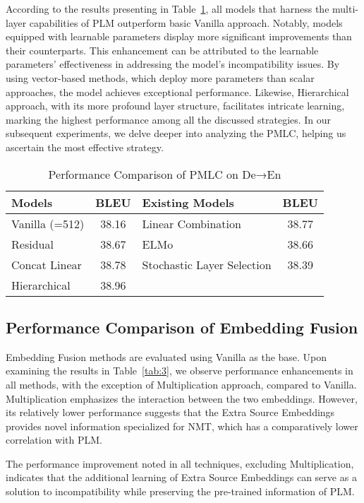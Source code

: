 \documentclass[conference]{IEEEtran}
\begin{document}
According to the results presenting in Table~\ref{tab:2}, all models that harness the multi-layer capabilities of PLM outperform basic Vanilla approach. Notably, models equipped with learnable parameters display more significant improvements than their counterparts. This enhancement can be attributed to the learnable parameters' effectiveness in addressing the model's incompatibility issues. By using vector-based methods, which deploy more parameters than scalar approaches, the model achieves exceptional performance. Likewise, Hierarchical approach, with its more profound layer structure, facilitates intricate learning, marking the highest performance among all the discussed strategies. In our subsequent experiments, we delve deeper into analyzing the PMLC, helping us ascertain the most effective strategy.
\begin{table}[!tb]
    \centering
    \caption{Performance Comparison of PMLC on De→En}
    \label{tab:2}
    \begin{tabular}{|l|c|l|c|}
        \hline
        \textbf{Models} & \textbf{BLEU} & \textbf{Existing Models} & \textbf{BLEU} \\
        \hline
        Vanilla (=512) & 38.16 & Linear Combination & 38.77 \\
        Residual & 38.67 & ELMo & 38.66 \\
        Concat Linear & 38.78 & Stochastic Layer Selection & 38.39 \\
        Hierarchical & 38.96 & & \\
        \hline
    \end{tabular}
\end{table}


\subsection{Performance Comparison of Embedding Fusion}
Embedding Fusion methods are evaluated using Vanilla as the base. Upon examining the results in Table~\ref{tab:3}, we observe performance enhancements in all methods, with the exception of Multiplication approach, compared to Vanilla. Multiplication emphasizes the interaction between the two embeddings. However, its relatively lower performance suggests that the Extra Source Embeddings provides novel information specialized for NMT, which has a comparatively lower correlation with PLM.

The performance improvement noted in all techniques, excluding Multiplication, indicates that the additional learning of Extra Source Embeddings can serve as a solution to incompatibility while preserving the pre-trained information of PLM.
\end{document}

